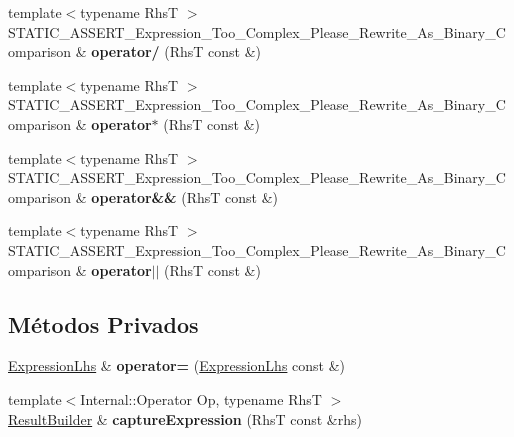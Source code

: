 \begin{DoxyCompactItemize}
\item 
{\footnotesize template$<$typename RhsT $>$ }\\S\+T\+A\+T\+I\+C\+\_\+\+A\+S\+S\+E\+R\+T\+\_\+\+Expression\+\_\+\+Too\+\_\+\+Complex\+\_\+\+Please\+\_\+\+Rewrite\+\_\+\+As\+\_\+\+Binary\+\_\+\+Comparison \& {\bfseries operator/} (RhsT const \&)\hypertarget{classCatch_1_1ExpressionLhs_a37d50565046ac9b1c9159a7c0cf88a1e}{}\label{classCatch_1_1ExpressionLhs_a37d50565046ac9b1c9159a7c0cf88a1e}

\item 
{\footnotesize template$<$typename RhsT $>$ }\\S\+T\+A\+T\+I\+C\+\_\+\+A\+S\+S\+E\+R\+T\+\_\+\+Expression\+\_\+\+Too\+\_\+\+Complex\+\_\+\+Please\+\_\+\+Rewrite\+\_\+\+As\+\_\+\+Binary\+\_\+\+Comparison \& {\bfseries operator$\ast$} (RhsT const \&)\hypertarget{classCatch_1_1ExpressionLhs_a9a94294c22449f62087862ef911e6291}{}\label{classCatch_1_1ExpressionLhs_a9a94294c22449f62087862ef911e6291}

\item 
{\footnotesize template$<$typename RhsT $>$ }\\S\+T\+A\+T\+I\+C\+\_\+\+A\+S\+S\+E\+R\+T\+\_\+\+Expression\+\_\+\+Too\+\_\+\+Complex\+\_\+\+Please\+\_\+\+Rewrite\+\_\+\+As\+\_\+\+Binary\+\_\+\+Comparison \& {\bfseries operator\&\&} (RhsT const \&)\hypertarget{classCatch_1_1ExpressionLhs_a7f022056ef4f25e716ab85846be6229f}{}\label{classCatch_1_1ExpressionLhs_a7f022056ef4f25e716ab85846be6229f}

\item 
{\footnotesize template$<$typename RhsT $>$ }\\S\+T\+A\+T\+I\+C\+\_\+\+A\+S\+S\+E\+R\+T\+\_\+\+Expression\+\_\+\+Too\+\_\+\+Complex\+\_\+\+Please\+\_\+\+Rewrite\+\_\+\+As\+\_\+\+Binary\+\_\+\+Comparison \& {\bfseries operator$\vert$$\vert$} (RhsT const \&)\hypertarget{classCatch_1_1ExpressionLhs_a6932b72da79d6c6b03d867772ceac61b}{}\label{classCatch_1_1ExpressionLhs_a6932b72da79d6c6b03d867772ceac61b}

\end{DoxyCompactItemize}
\subsection*{Métodos Privados}
\begin{DoxyCompactItemize}
\item 
\hyperlink{classCatch_1_1ExpressionLhs}{Expression\+Lhs} \& {\bfseries operator=} (\hyperlink{classCatch_1_1ExpressionLhs}{Expression\+Lhs} const \&)\hypertarget{classCatch_1_1ExpressionLhs_ad5e7665e4f0191caa17523a6a8eab5b0}{}\label{classCatch_1_1ExpressionLhs_ad5e7665e4f0191caa17523a6a8eab5b0}

\item 
{\footnotesize template$<$Internal\+::\+Operator Op, typename RhsT $>$ }\\\hyperlink{classCatch_1_1ResultBuilder}{Result\+Builder} \& {\bfseries capture\+Expression} (RhsT const \&rhs)\hypertarget{classCatch_1_1ExpressionLhs_a9e1962527b6ae99da14a95fca07f6125}{}\label{classCatch_1_1ExpressionLhs_a9e1962527b6ae99da14a95fca07f6125}

\end{DoxyCompactItemize}
